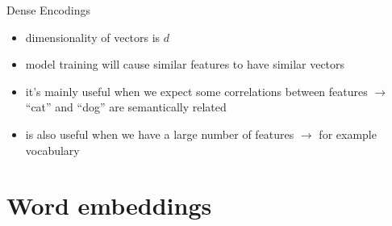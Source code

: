 \documentclass[12pt, handout]{beamer}
\begin{document}
\begin{frame}{Dense Encodings}
	\begin{itemize}
		\item<1-> dimensionality of vectors is $d$
		\item<2-> model training will cause similar features to have similar vectors
		\item<3-> it's mainly useful when we expect some correlations between features $\rightarrow$ ``cat'' and ``dog'' are semantically related
		\item<4-> is also useful when we have a large number of features $\rightarrow$ for example vocabulary
	\end{itemize}
\end{frame}

\section{Word embeddings}
\end{document}
